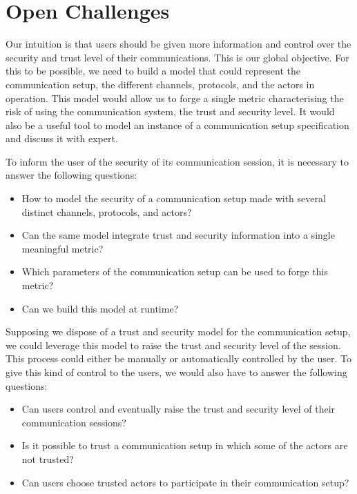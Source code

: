 \section*{Open Challenges}
\label{introduction.challenges}
Our intuition is that users should be given more information and control over the security and trust level of their communications.
This is our global objective.
For this to be possible, we need to build a model that could represent the communication setup, the different channels, protocols, and the actors in operation.
This model would allow us to forge a single metric characterising the risk of using the communication system, \ie the trust and security level.
It would also be a useful tool to model an instance of a communication setup specification and discuss it with expert.

To inform the user of the security of its communication session, it is necessary to answer the following questions:
\begin{itemize}
\item How to model the security of a communication setup made with several distinct channels, protocols, and actors?
\item Can the same model integrate trust and security information into a single meaningful metric?
\item Which parameters of the communication setup can be used to forge this metric?
\item Can we build this model at runtime?
\end{itemize}

Supposing we dispose of a trust and security model for the communication setup, we could leverage this model to raise the trust and security level of the session.
This process could either be manually or automatically controlled by the user.
To give this kind of control to the users, we would also have to answer the following questions:
\begin{itemize}
\item Can users control and eventually raise the trust and security level of their communication sessions?
\item Is it possible to trust a communication setup in which some of the actors are not trusted?
\item Can users choose trusted actors to participate in their communication setup?
\end{itemize}


